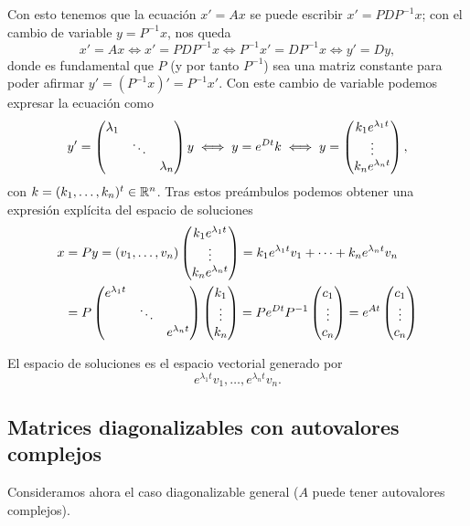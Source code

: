 \documentclass[../ecuaciones_diferenciales.tex]{subfiles}
\begin{document}
Con esto tenemos que la ecuación \(x' = Ax\) se puede escribir
\(x' = P D P^{-1} x\); con el cambio de variable \(y = P^{-1}x\), nos queda
\[x' = Ax \iff x' = PDP^{-1}x \iff P^{-1}x' = DP^{-1}x \iff y' = Dy,\]
donde es fundamental que \(P\) (y por tanto \(P^{-1}\)) sea una matriz constante
para poder afirmar \(y' = (P^{-1}x)' = P^{-1}x'\). Con este cambio de variable
podemos expresar la ecuación como
\[y' = \begin{pmatrix}\lambda_1 && \\ & \ddots & \\ && \lambda_n\end{pmatrix} y \iff
	y = e^{Dt}k \iff y = \begin{pmatrix}k_1 e^{\lambda_1 t} \\ \vdots \\
		k_n e^{\lambda_n t}\end{pmatrix},\]
con \(k = (k_1, \dots, k_n)^t \in \mathbb{R}^n\).
Tras estos preámbulos podemos obtener
una expresión explícita del espacio de soluciones
\begin{align*}
	x &= Py = (v_1, \dots, v_n) \begin{pmatrix}k_1 e^{\lambda_1 t} \\ \vdots \\ k_n e^{\lambda_n t}\end{pmatrix} =
    k_1 e^{\lambda_1 t} v_1 + \cdots + k_n e^{\lambda_n t}v_n \\
	  &= P \begin{pmatrix}e^{\lambda_1 t} & & \\ & \ddots & \\ & & e^{\lambda_n t}\end{pmatrix}
      \begin{pmatrix}k_1 \\ \vdots \\ k_n\end{pmatrix} = P e^{D t} P^{-1} \begin{pmatrix}c_1 \\ \vdots \\ c_n\end{pmatrix} =
      e^{A t} \begin{pmatrix}c_1 \\ \vdots \\ c_n\end{pmatrix}
\end{align*}

\begin{remark}
  El espacio de soluciones es el espacio vectorial generado por
  \[e^{\lambda_1 t} v_1, \dots, e^{\lambda_n t} v_n.\]
\end{remark}
\pagebreak

\subsection{Matrices diagonalizables con autovalores complejos}

Consideramos ahora el caso diagonalizable general (\(A\) puede tener
autovalores complejos).
\end{document}
